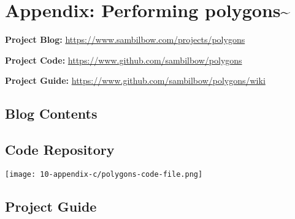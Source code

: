 \chapter{Appendix: Performing polygons\textasciitilde{}}

\noindent \textbf{Project Blog:}        \url{https://www.sambilbow.com/projects/polygons}

\noindent \textbf{Project Code:}        \url{https://www.github.com/sambilbow/polygons}

\noindent \textbf{Project Guide:}       \url{https://www.github.com/sambilbow/polygons/wiki}


\section{Blog Contents}
\section{Code Repository}
\texttt{[image: 10-appendix-c/polygons-code-file.png]}
\section{Project Guide}
